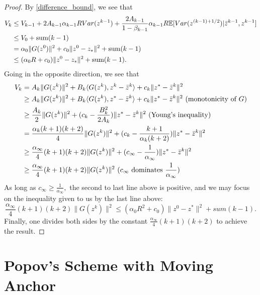 \documentclass[11pt,reqno,oneside]{amsart}
\theoremstyle{definition}
\numberwithin{equation}{section}
\begin{document}
\begin{proof}
    By \eqref{difference_bound}, we see that
    \begin{align}
        V_{k} &\leq V_{k-1} + 2A_{k-1}\alpha_{k-1}RVar(z^{k-1}) + \frac{2A_{k-1}}{1 - \beta_{k-1}}\alpha_{k-1}R\mathbb{E}[Var(z^{(k-1)+1/2})|\bar{z}^{k-1},z^{k-1}] \notag \\
        &\leq V_{0} + \text{sum}(k-1) \notag \\
        &= \alpha_{0}\|G(z^{0})\|^{2} + c_{0}\|z^{0} - z_{*}\|^{2} + \text{sum}(k-1) \notag \\
        &\leq (\alpha_{0}R + c_{0})\|z^{0} - z_{*}\|^{2} + \text{sum}(k-1). \notag
    \end{align}
    Going in the opposite direction, we see that
    \begin{align}
        \notag V_{k} &= A_{k}\|G(z^{k})\|^{2} + B_{k}\langle G(z^{k}),z^{k}-\bar{z}^{k}\rangle + c_{k}\|z^{*}-\bar{z}^{k}\|^{2}\\
        \notag &\geq A_{k}\|G(z^{k})\|^{2} + B_{k}\langle G(z^{k}),z^{*}-\bar{z}^{k}\rangle + c_{k}\|z^{*}-\bar{z}^{k}\|^{2} \text{ (monotonicity of $G$)}\\
        \notag &\geq \frac{A_{k}}{2}\|G(z^{k})\|^{2} + (c_{k} - \frac{B_{k}^{2}}{2A_{k}})\|z^{*}-\bar{z}^{k}\|^{2} \text{ (Young's inequality)}\\
        \notag &=\frac{\alpha_{k}(k+1)(k+2)}{4}\|G(z^{k})\|^{2} + (c_{k} - \frac{k+1}{\alpha_{k}(k+2)})\|z^{*}-\bar{z}^{k}\|^{2}\\
        \notag &\geq \frac{\alpha_{\infty}}{4}(k+1)(k+2)\|G(z^{k})\|^{2} + (c_{\infty} - \frac{1}{\alpha_{\infty}})\|z^{*}-\bar{z}^{k}\|^{2}\\
        \notag &\geq \frac{\alpha_{\infty}}{4}(k+1)(k+2)\|G(z^{k})\|^{2} \text{ ($c_{\infty}$ dominates $\frac{1}{\alpha_{\infty}}$)}
    \end{align}
    As long as $c_{\infty} \geq \frac{1}{\alpha_{\infty}},$ the second to last line above is positive, and we may focus on the inequality given to us by the last line above:
    \[
        \frac{\alpha_{\infty}}{4}(k+1)(k+2)\|G(z^{k})\|^{2} \leq (\alpha_{0}R^{2} + c_{0})\|z^{0}-z^{*}\|^{2} + sum(k-1).
    \]
    Finally, one divides both sides by the constant $\frac{\alpha_{\infty}}{4}(k+1)(k+2)$ to achieve the result.
\end{proof}

\section{Popov's Scheme with Moving Anchor} \label{sec: MAP_section}
\end{document}
